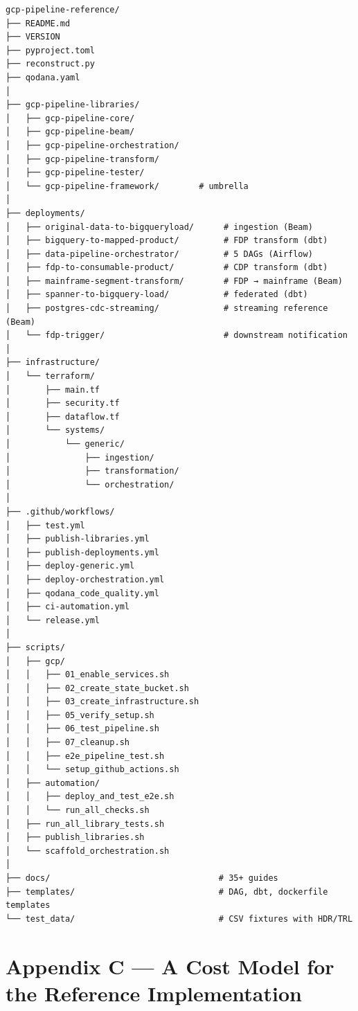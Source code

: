 \documentclass[
  11pt,
  british,
  oneside]{book}
\begin{document}
\begin{verbatim}
gcp-pipeline-reference/
├── README.md
├── VERSION
├── pyproject.toml
├── reconstruct.py
├── qodana.yaml
│
├── gcp-pipeline-libraries/
│   ├── gcp-pipeline-core/
│   ├── gcp-pipeline-beam/
│   ├── gcp-pipeline-orchestration/
│   ├── gcp-pipeline-transform/
│   ├── gcp-pipeline-tester/
│   └── gcp-pipeline-framework/        # umbrella
│
├── deployments/
│   ├── original-data-to-bigqueryload/      # ingestion (Beam)
│   ├── bigquery-to-mapped-product/         # FDP transform (dbt)
│   ├── data-pipeline-orchestrator/         # 5 DAGs (Airflow)
│   ├── fdp-to-consumable-product/          # CDP transform (dbt)
│   ├── mainframe-segment-transform/        # FDP → mainframe (Beam)
│   ├── spanner-to-bigquery-load/           # federated (dbt)
│   ├── postgres-cdc-streaming/             # streaming reference (Beam)
│   └── fdp-trigger/                        # downstream notification
│
├── infrastructure/
│   └── terraform/
│       ├── main.tf
│       ├── security.tf
│       ├── dataflow.tf
│       └── systems/
│           └── generic/
│               ├── ingestion/
│               ├── transformation/
│               └── orchestration/
│
├── .github/workflows/
│   ├── test.yml
│   ├── publish-libraries.yml
│   ├── publish-deployments.yml
│   ├── deploy-generic.yml
│   ├── deploy-orchestration.yml
│   ├── qodana_code_quality.yml
│   ├── ci-automation.yml
│   └── release.yml
│
├── scripts/
│   ├── gcp/
│   │   ├── 01_enable_services.sh
│   │   ├── 02_create_state_bucket.sh
│   │   ├── 03_create_infrastructure.sh
│   │   ├── 05_verify_setup.sh
│   │   ├── 06_test_pipeline.sh
│   │   ├── 07_cleanup.sh
│   │   ├── e2e_pipeline_test.sh
│   │   └── setup_github_actions.sh
│   ├── automation/
│   │   ├── deploy_and_test_e2e.sh
│   │   └── run_all_checks.sh
│   ├── run_all_library_tests.sh
│   ├── publish_libraries.sh
│   └── scaffold_orchestration.sh
│
├── docs/                                  # 35+ guides
├── templates/                             # DAG, dbt, dockerfile templates
└── test_data/                             # CSV fixtures with HDR/TRL
\end{verbatim}

\newpage

\hypertarget{appendix-c-a-cost-model-for-the-reference-implementation}{%
\chapter{Appendix C --- A Cost Model for the Reference
Implementation}\label{appendix-c-a-cost-model-for-the-reference-implementation}}
\end{document}
